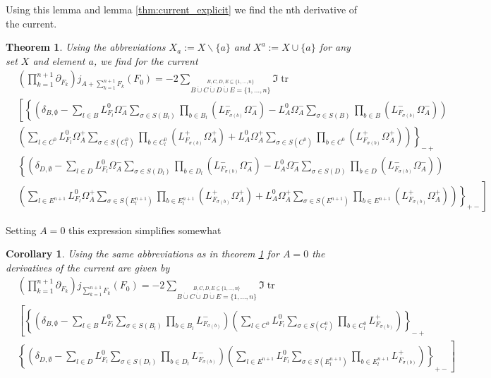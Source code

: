 \documentclass[oneside,reqno,12pt]{amsart}
\newtheorem{Thm}[Def]{Theorem}
\newtheorem{Corollary}[Def]{Corollary}
\DeclareMathOperator{\tr}{tr}
\begin{document}
Using this lemma and lemma \ref{thm:current_explicit} we find the nth derivative of the current.
\begin{Thm}\label{thm:GeneralDerivative}
Using the abbreviations \(X_a:= X\backslash \{a\}\) and \(X^a:= X\cup \{a\}\) for any set \(X\) and element \(a\), we find for the current
\begin{align*}
&\left(\prod_{k=1}^{n+1} \partial_{F_k}\right) j_{A+\sum_{k=1}^{n+1}F_k}(F_0) 
= -2 \sum_{\stackrel{B,C,D,E\subseteq \{1,\dots, n\}}{B\dot{\cup}C\dot{\cup}D\dot{\cup}E=\{1,\dots, n\}}}
\Im \tr \\
&\left[ 
\left\{\left(\delta_{B,\emptyset} - \sum_{l\in B} L^0_{F_l} \Omega^-_A \sum_{\sigma \in S(B_l)} \prod_{b\in B_l} \left( L^-_{F_{\sigma(b)}} \Omega^-_A\right) - L^0_A \Omega^-_A \sum_{\sigma \in S(B)} \prod_{b\in B} \left( L^-_{F_{\sigma(b)}}\Omega^-_A\right)
\right) \right.\right. \\
&\left. \left. \left(  \sum_{l\in C^0} L^0_{F_l} \Omega^+_A \sum_{\sigma \in S(C^0_l)} \prod_{b\in C^0_l} \left( L^+_{F_{\sigma(b)}} \Omega^+_A\right) 
+ L^0_A \Omega^+_A \sum_{\sigma \in S(C^0)} \prod_{b\in C^0} \left( L^+_{F_{\sigma(b)}}\Omega^+_A\right)
\right) \right\}_{-+}\right. \\
&\left.  \left\{\left(\delta_{D,\emptyset} - \sum_{l\in D} L^0_{F_l} \Omega^-_A \sum_{\sigma \in S(D_l)} \prod_{b\in D_l} \left( L^-_{F_{\sigma(b)}} \Omega^-_A\right) - L^0_A \Omega^-_A \sum_{\sigma \in S(D)} \prod_{b\in D} \left( L^-_{F_{\sigma(b)}}\Omega^-_A\right)\right)\right.\right.\\
&\left. \left. \left( \sum_{l\in E^{n+1}} L^0_{F_l} \Omega^+_A \sum_{\sigma \in S\left(E^{n+1}_l\right)} \prod_{b\in E^{n+1}_l} \left( L^+_{F_{\sigma(b)}} \Omega^+_A\right) 
 + L^0_A \Omega^+_A \sum_{\sigma \in S\left(E^{n+1}\right)} \prod_{b\in E^{n+1}} \left( L^+_{F_{\sigma(b)}}\Omega^+_A\right)
\right) \right\}_{+-}
\right]
\end{align*}
\end{Thm}

Setting \(A=0\) this expression simplifies somewhat
\begin{Corollary}
Using the same abbreviations as in theorem \ref{thm:GeneralDerivative} for \(A=0\) the derivatives of the current are given by
\begin{align*}
&\left(\prod_{k=1}^{n+1} \partial_{F_k}\right) j_{\sum_{k=1}^{n+1}F_k }(F_0) 
= -2 \sum_{\stackrel{B,C,D,E\subseteq \{1,\dots, n\}}{B\dot{\cup}C\dot{\cup}D\dot{\cup}E=\{1,\dots, n\}}}
\Im \tr \\
&\left[ 
\left\{\left(\delta_{B,\emptyset} - \sum_{l\in B} L^0_{F_l} \sum_{\sigma \in S(B_l)} \prod_{b\in B_l}  L^-_{F_{\sigma(b)}}
\right) 
 \left(  \sum_{l\in C^0} L^0_{F_l} \sum_{\sigma \in S(C^0_l)} \prod_{b\in C^0_l}  L^+_{F_{\sigma(b)}}
\right) \right\}_{-+}\right. \\
&\left.  \left\{\left(\delta_{D,\emptyset} - \sum_{l\in D} L^0_{F_l} \sum_{\sigma \in S(D_l)} \prod_{b\in D_l}  L^-_{F_{\sigma(b)}} \right)
 \left( \sum_{l\in E^{n+1}} L^0_{F_l} \sum_{\sigma \in S\left(E^{n+1}_l\right)} \prod_{b\in E^{n+1}_l}  L^+_{F_{\sigma(b)}} 
\right) \right\}_{+-}
\right]
\end{align*}
\end{Corollary}
\end{document}
